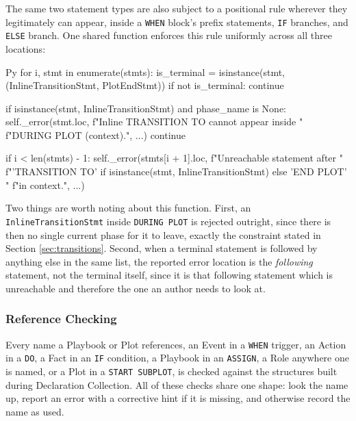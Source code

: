 The same two statement types are also subject to a positional rule wherever they legitimately can appear, inside a \lstinline|WHEN| block's prefix statements, \lstinline|IF| branches, and \lstinline|ELSE| branch. One shared function enforces this rule uniformly across all three locations:
\begin{codeblock}[]{Py}
for i, stmt in enumerate(stmts):
    is_terminal = isinstance(stmt, (InlineTransitionStmt, PlotEndStmt))
    if not is_terminal:
        continue

    if isinstance(stmt, InlineTransitionStmt) and phase_name is None:
        self._error(stmt.loc, f"Inline TRANSITION TO cannot appear inside "
            f"DURING PLOT ({context}).", ...)
        continue

    if i < len(stmts) - 1:
        self._error(stmts[i + 1].loc, f"Unreachable statement after "
            f"{'TRANSITION TO' if isinstance(stmt, InlineTransitionStmt) else 'END PLOT'} "
            f"in {context}.", ...)
\end{codeblock}
Two things are worth noting about this function. First, an \lstinline|InlineTransitionStmt| inside \lstinline|DURING PLOT| is rejected outright, since there is then no single current phase for it to leave, exactly the constraint stated in Section \ref{sec:transitions}. Second, when a terminal statement is followed by anything else in the same list, the reported error location is the \emph{following} statement, not the terminal itself, since it is that following statement which is unreachable and therefore the one an author needs to look at.

\subsubsection{Reference Checking}
Every name a Playbook or Plot references, an Event in a \lstinline|WHEN| trigger, an Action in a \lstinline|DO|, a Fact in an \lstinline|IF| condition, a Playbook in an \lstinline|ASSIGN|, a Role anywhere one is named, or a Plot in a \lstinline|START SUBPLOT|, is checked against the structures built during Declaration Collection. All of these checks share one shape: look the name up, report an error with a corrective hint if it is missing, and otherwise record the name as used.

